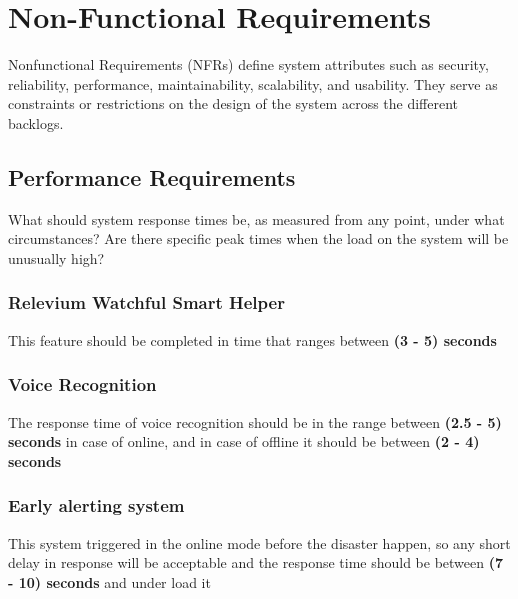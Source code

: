 \documentclass{scrreprt}
\begin{document}
\chapter{Non-Functional Requirements}
Nonfunctional Requirements (NFRs) define system attributes such as security, reliability, performance, maintainability, scalability, and usability. They serve as constraints or restrictions on the design of the system across the different backlogs.

\section{Performance Requirements}
What should system response times be, as measured from any point, under what circumstances?
Are there specific peak times when the load on the system will be unusually high?

\subsection{Relevium Watchful Smart Helper}
This feature should be completed in time that ranges between \textbf{(3 - 5) seconds}


\subsection{Voice Recognition}
The response time of voice recognition should be in the range between \textbf{(2.5 - 5) seconds} in case of online, and in case of offline it should be between \textbf{(2 - 4) seconds}

\subsection{Early alerting system}
This system triggered in the online mode before the disaster happen, so any short delay in response will
be acceptable and the response time should be between \textbf{(7 - 10) seconds} and under load it 
\end{document}
